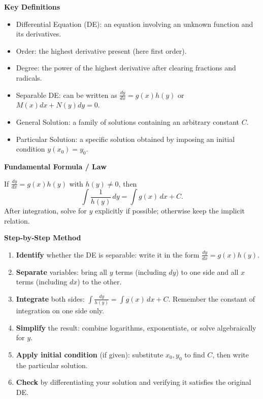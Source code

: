 \documentclass[11pt]{article}
\newcommand{\cle}[1]{{\popxbold\color{popdark}#1}}
\begin{document}
\begin{bilan}
\textbf{Key Definitions}\par
\begin{itemize}
\item \cle{Differential Equation (DE)}: an equation involving an unknown function and its derivatives.
\item \cle{Order}: the highest derivative present (here first order).
\item \cle{Degree}: the power of the highest derivative after clearing fractions and radicals.
\item \cle{Separable DE}: can be written as $\frac{dy}{dx}=g(x)h(y)$ or $M(x)dx+N(y)dy=0$.
\item \cle{General Solution}: a family of solutions containing an arbitrary constant $C$.
\item \cle{Particular Solution}: a specific solution obtained by imposing an \cle{initial condition} $y(x_0)=y_0$.
\end{itemize}

\textbf{Fundamental Formula / Law}\par
If $\frac{dy}{dx}=g(x)h(y)$ with $h(y)\neq0$, then
\[
\int\frac{1}{h(y)}\,dy = \int g(x)\,dx + C.
\]
After integration, solve for $y$ explicitly if possible; otherwise keep the implicit relation.

\textbf{Step‑by‑Step Method}\par
\begin{enumerate}
\item \textbf{Identify} whether the DE is separable: write it in the form $\frac{dy}{dx}=g(x)h(y)$.
\item \textbf{Separate} variables: bring all $y$ terms (including $dy$) to one side and all $x$ terms (including $dx$) to the other.
\item \textbf{Integrate} both sides: $\int\frac{dy}{h(y)} = \int g(x)\,dx + C$. Remember the constant of integration on one side only.
\item \textbf{Simplify} the result: combine logarithms, exponentiate, or solve algebraically for $y$.
\item \textbf{Apply initial condition} (if given): substitute $x_0,y_0$ to find $C$, then write the particular solution.
\item \textbf{Check} by differentiating your solution and verifying it satisfies the original DE.
\end{enumerate}


\end{bilan}
\end{document}
